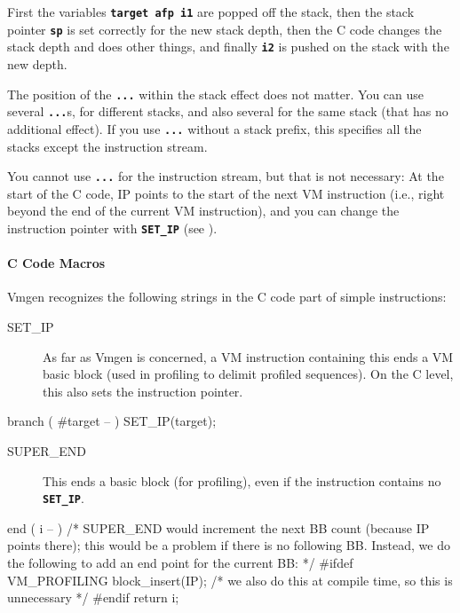 \documentclass[10pt,english]{article}
\begin{document}
First the variables \texttt{\textbf{target afp i1}} are popped off
the stack, then the stack pointer \texttt{\textbf{sp}} is set correctly
for the new stack depth, then the C code changes the stack depth and
does other things, and finally \texttt{\textbf{i2}} is pushed on the
stack with the new depth.

The position of the \texttt{\textbf{...}} within the stack effect
does not matter. You can use several \texttt{\textbf{...}}s, for different
stacks, and also several for the same stack (that has no additional
effect). If you use \texttt{\textbf{...}} without a stack prefix,
this specifies all the stacks except the instruction stream.

You cannot use \texttt{\textbf{...}} for the instruction stream, but
that is not necessary: At the start of the C code, IP points to the
start of the next VM instruction (i.e., right beyond the end of the
current VM instruction), and you can change the instruction pointer
with \texttt{\textbf{SET\_IP}} (see ).


\paragraph{C Code Macros\label{par:C-Code-Macros}}

Vmgen recognizes the following strings in the C code part of simple
instructions:
\begin{description}
\item [{SET\_IP}] As far as Vmgen is concerned, a VM instruction containing
this ends a VM basic block (used in profiling to delimit profiled
sequences). On the C level, this also sets the instruction pointer.
\end{description}
\nwenddocs{}\endmoddef
branch ( #target -- )
SET_IP(target);
\nwendcode{}\nwdocspar

\begin{description}
\item [{SUPER\_END}] This ends a basic block (for profiling), even if the
instruction contains no \texttt{\textbf{SET\_IP}}.
\end{description}
\nwenddocs{}\endmoddef
end ( i -- )
/* SUPER_END would increment the next BB count (because IP points there);
   this would be a problem if there is no following BB.
   Instead, we do the following to add an end point for the current BB: */
#ifdef VM_PROFILING
block_insert(IP); /* we also do this at compile time, so this is unnecessary */
#endif
return i;
\nwendcode{}\nwdocspar
\end{document}
